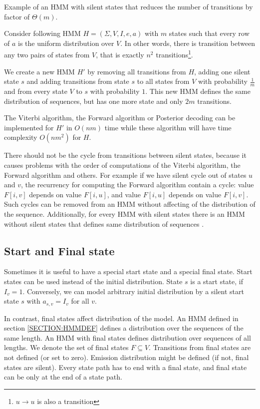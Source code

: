 \begin{example}
Example of an HMM with silent states that reduces the number of transitions by factor
of $\Theta(m)$.

Consider following HMM $H=(\Sigma,V,I,e,a)$ with $m$ states such that every row
of $a$ is the uniform distribution over $V$. In other words, there is transition
between any two pairs of states from $V$, that is exactly $n^2$
transitions\footnote{$u\to u$ is also a transition}.

We create a new HMM $H'$ by removing all transitions from $H$, adding one silent
state $s$ and adding transitions
from state $s$ to all states from $V$ with probability $\frac1m$  and from every
state $V$ to $s$ with probability $1$. This new HMM
defines the same distribution of sequences, but has one more state and only $2m$
transitions. 

The Viterbi algorithm, the Forward algorithm or Posterior decoding can be
implemented for $H'$ in $O(nm)$ time while these algorithm will have time
complexity $O(nm^2)$ for $H$.
\end{example}

There should not be the cycle from transitions between silent states, because
it causes problems with the order of computations of the Viterbi algorithm, the
Forward algorithm and others. For example if we have silent cycle out of states
$u$ and $v$, the recurrency for computing the Forward algorithm contain a
cycle: value $F[i, v]$ depends on value $F[i, u]$, and value $F[i,u]$ depends
on value $F[i, v]$.  Such cycles can be removed from an HMM without affecting
of the distribution of the sequence. Additionally, for every HMM with silent
states there is an HMM without silent states that defines same distribution of
sequences \cite{Nanasi2010mgr}.


\subsection{Start and Final state}

Sometimes it is useful to have a special start state and a special final state.
Start states can be used instead of the initial distribution. State $s$ is a start
state, if $I_v=1$. Conversely, we can model arbitrary initial distribution by a silent start state $s$
with $a_{s,v}=I_v$ for all $v$.

In contrast, final states affect distribution of the model. An HMM defined in section
\ref{SECTION:HMMDEF} defines a distribution over the sequences of the same length.
An HMM with
final states defines distribution over sequences of all lengths.  We denote the
set of final states $F\subseteq V$. Transitions from final states are not
defined (or set to zero). Emission distribution might be defined (if not, final
states are silent). Every state path has to end with a final state, and
final state can be only at the end of a state path.

